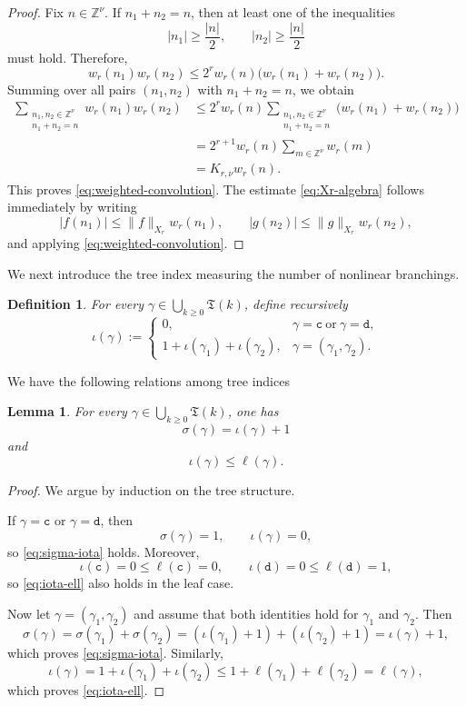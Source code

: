 \documentclass[12pt,reqno,tbtags]{amsart}
\newtheorem{definition}{Definition}[section]
\newtheorem{lemma}{Lemma}[section]
\newcommand\1{\mathbbm{1}}
\begin{document}
\begin{proof}
Fix $n\in\mathbb Z^\nu$. If $n_1+n_2=n$, then at least one of the inequalities
\[
|n_1|\ge \frac{|n|}{2},
\qquad
|n_2|\ge \frac{|n|}{2}
\]
must hold. Therefore,
\[
w_r(n_1)w_r(n_2)
\le
2^r w_r(n)\bigl(w_r(n_1)+w_r(n_2)\bigr).
\]
Summing over all pairs $(n_1,n_2)$ with $n_1+n_2=n$, we obtain
\begin{align*}
\sum_{\substack{n_1,n_2\in\mathbb Z^\nu\\ n_1+n_2=n}}
w_r(n_1)w_r(n_2)
&\le
2^r w_r(n)
\sum_{\substack{n_1,n_2\in\mathbb Z^\nu\\ n_1+n_2=n}}
\bigl(w_r(n_1)+w_r(n_2)\bigr) \\
&=
2^{r+1}w_r(n)\sum_{m\in\mathbb Z^\nu}w_r(m) \\
&=
K_{r,\nu}w_r(n).
\end{align*}
This proves \eqref{eq:weighted-convolution}. The estimate \eqref{eq:Xr-algebra}
follows immediately by writing
\[
|f(n_1)|\le \|f\|_{X_r}w_r(n_1),
\qquad
|g(n_2)|\le \|g\|_{X_r}w_r(n_2),
\]
and applying \eqref{eq:weighted-convolution}.
\end{proof}

We next introduce the tree index measuring the number of nonlinear branchings.

\begin{definition}
For every $\gamma\in\bigcup_{k\ge0}\mathfrak T(k)$, define recursively
\[
\iota(\gamma):=
\begin{cases}
0, & \gamma=\mathtt c\ \text{or}\ \gamma=\mathtt d,\\[1mm]
1+\iota(\gamma_1)+\iota(\gamma_2), & \gamma=(\gamma_1,\gamma_2).
\end{cases}
\]
\end{definition}
We have the following relations among tree indices
\begin{lemma}\label{lem:tree-index-relations}
For every $\gamma\in\bigcup_{k\ge0}\mathfrak T(k)$, one has
\begin{equation}\label{eq:sigma-iota}
\sigma(\gamma)=\iota(\gamma)+1
\end{equation}
and
\begin{equation}\label{eq:iota-ell}
\iota(\gamma)\le \ell(\gamma).
\end{equation}
\end{lemma}

\begin{proof}
We argue by induction on the tree structure.

If $\gamma=\mathtt c$ or $\gamma=\mathtt d$, then
\[
\sigma(\gamma)=1,
\qquad
\iota(\gamma)=0,
\]
so \eqref{eq:sigma-iota} holds. Moreover,
\[
\iota(\mathtt c)=0\le \ell(\mathtt c)=0,
\qquad
\iota(\mathtt d)=0\le \ell(\mathtt d)=1,
\]
so \eqref{eq:iota-ell} also holds in the leaf case.

Now let $\gamma=(\gamma_1,\gamma_2)$ and assume that both identities hold for
$\gamma_1$ and $\gamma_2$. Then
\[
\sigma(\gamma)
=
\sigma(\gamma_1)+\sigma(\gamma_2)
=
(\iota(\gamma_1)+1)+(\iota(\gamma_2)+1)
=
\iota(\gamma)+1,
\]
which proves \eqref{eq:sigma-iota}. Similarly,
\[
\iota(\gamma)
=
1+\iota(\gamma_1)+\iota(\gamma_2)
\le
1+\ell(\gamma_1)+\ell(\gamma_2)
=
\ell(\gamma),
\]
which proves \eqref{eq:iota-ell}.
\end{proof}
\end{document}
